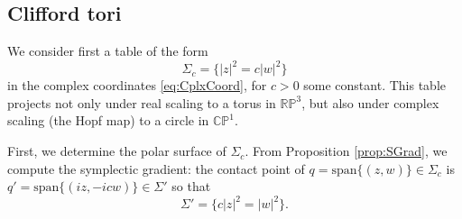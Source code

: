 \documentclass{article}
\begin{document}

\subsection{Clifford tori}\label{sec:ClTori}

We consider first a table of the form
\[ \Sigma_c = \{ |z|^2 = c|w|^2 \} \]
in the complex coordinates \eqref{eq:CplxCoord}, for $c>0$ some
constant. This table projects not only under real scaling to a torus in $\mathbb{RP}^3$, but also under complex scaling (the Hopf map) to a circle in $\mathbb{CP}^1$.

First, we determine the polar surface of $\Sigma_c$. From Proposition \ref{prop:SGrad}, we compute the symplectic gradient: the contact point of $q = \text{span}\{ (z,w)\}\in\Sigma_c$ is $q' = \text{span}\{ (iz,-icw)\}\in\Sigma'$ so that
\[ \Sigma' = \{ c|z|^2 = |w|^2\}.\]

\end{document}

